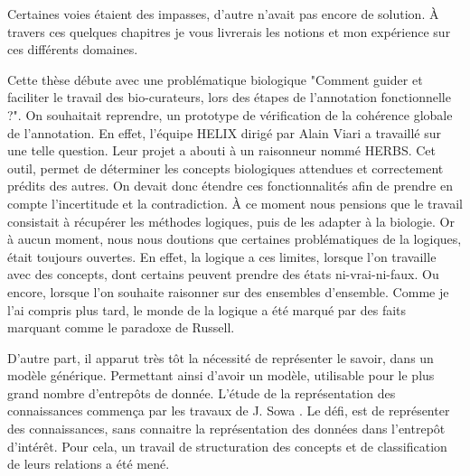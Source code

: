 Certaines voies étaient des impasses, d'autre n'avait pas encore de solution. À travers ces quelques chapitres je vous livrerais les notions et mon expérience sur ces différents domaines.

Cette thèse débute avec une problématique biologique "Comment guider et faciliter le travail des bio-curateurs, lors des étapes de l'annotation fonctionnelle ?". On souhaitait reprendre, un prototype de vérification de la cohérence globale de l'annotation. En effet, l'équipe HELIX dirigé par Alain Viari a travaillé sur une telle question. Leur projet a abouti à un raisonneur nommé HERBS. Cet outil, permet de déterminer les concepts biologiques attendues et correctement prédits des autres. On devait donc étendre ces fonctionnalités afin de prendre en compte l'incertitude et la contradiction. À ce moment nous pensions que le travail consistait à récupérer les méthodes logiques, puis de les adapter à la biologie. Or à aucun moment, nous nous doutions que certaines problématiques de la logiques, était toujours ouvertes. En effet, la logique a ces limites, lorsque l'on travaille avec des concepts, dont certains peuvent prendre des états ni-vrai-ni-faux. Ou encore, lorsque l'on souhaite raisonner sur des ensembles d'ensemble. Comme je l'ai compris plus tard, le monde de la logique a été marqué par des faits marquant comme le paradoxe de Russell.


D'autre part, il apparut très tôt la nécessité de représenter le savoir, dans un modèle générique. Permettant ainsi d'avoir un modèle, utilisable pour le plus grand nombre d'entrepôts de donnée. L'étude de la représentation des connaissances commença par les travaux de J. Sowa \citeyearpar{sowa92,sowa99}. Le défi, est de représenter des connaissances, sans connaitre la représentation des données dans l'entrepôt d'intérêt. Pour cela, un travail de structuration des concepts et de classification de leurs relations a été mené.
